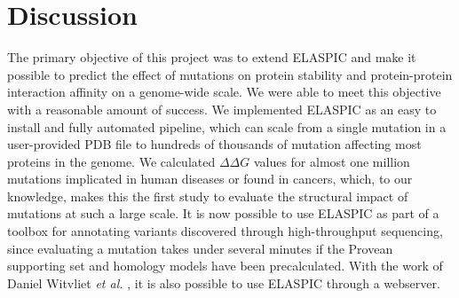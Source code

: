 
\chapter{Discussion} \label{ch:discussion}

The primary objective of this project was to extend ELASPIC and make it possible to predict the effect of mutations on protein stability and protein-protein interaction affinity on a genome-wide scale. We were able to meet this objective with a reasonable amount of success. We implemented ELASPIC as an easy to install and fully automated pipeline, which can scale from a single mutation in a user-provided PDB file to hundreds of thousands of mutation affecting most proteins in the genome. We calculated $\Delta \Delta G$ values for almost one million mutations implicated in human diseases or found in cancers, which, to our knowledge, makes this the first study to evaluate the structural impact of mutations at such a large scale. It is now possible to use ELASPIC as part of a toolbox for annotating variants discovered through high-throughput sequencing, since evaluating a mutation takes under several minutes if the Provean supporting set and homology models have been precalculated. With the work of Daniel Witvliet \textit{et al.} \cite{witvliet_elaspic_2016}, it is also possible to use ELASPIC through a webserver.


